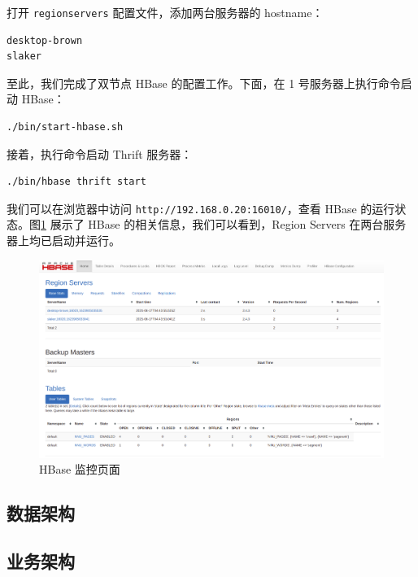 \documentclass{ctexart}
\newcommand{\code}[1]{\colorbox{backcolor}{\lstinline|#1|}}
\begin{document}
    打开 \code{regionservers} 配置文件，添加两台服务器的 hostname：

    \begin{lstlisting}[language=bash]
desktop-brown
slaker
    \end{lstlisting}

    至此，我们完成了双节点 HBase 的配置工作。下面，在 1 号服务器上执行命令启动 HBase：

    \begin{lstlisting}[language=bash]
./bin/start-hbase.sh
    \end{lstlisting}

    接着，执行命令启动 Thrift 服务器：

    \begin{lstlisting}[language=bash]
./bin/hbase thrift start
    \end{lstlisting}

    我们可以在浏览器中访问 \code{http://192.168.0.20:16010/}，查看 HBase 的运行状态。图\ref{fig:archicture_hbase-web} 展示了 HBase 的相关信息，我们可以看到，Region Servers 在两台服务器上均已启动并运行。

    \begin{figure}[t]
        \centering
        \includegraphics[width=\textwidth]{src/archicture_hbase-web}
        \caption{HBase 监控页面}
        \label{fig:archicture_hbase-web}
    \end{figure}

    \subsection{数据架构}\label{subsec:crawl}

    \subsection{业务架构}\label{subsec:crawl}
\end{document}
